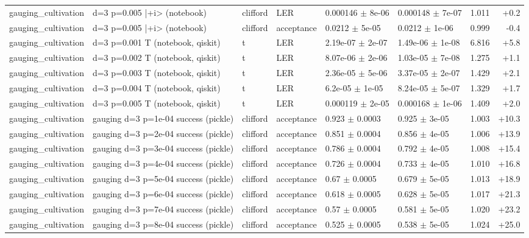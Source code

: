 \documentclass[10pt]{article}
\begin{document}
{\begin{longtable}{l l l l l l r r}
gauging\_cultivation & d=3 p=0.005 |+i> (notebook) & clifford & LER & 0.000146 $\pm$ 8e-06 & 0.000148 $\pm$ 7e-07 & 1.011 & +0.2 \\
gauging\_cultivation & d=3 p=0.005 |+i> (notebook) & clifford & acceptance & 0.0212 $\pm$ 5e-05 & 0.0212 $\pm$ 1e-06 & 0.999 & -0.4 \\
gauging\_cultivation & d=3 p=0.001 T (notebook, qiskit) & t & LER & 2.19e-07 $\pm$ 2e-07 & 1.49e-06 $\pm$ 1e-08 & 6.816 & +5.8 \\
gauging\_cultivation & d=3 p=0.002 T (notebook, qiskit) & t & LER & 8.07e-06 $\pm$ 2e-06 & 1.03e-05 $\pm$ 7e-08 & 1.275 & +1.1 \\
gauging\_cultivation & d=3 p=0.003 T (notebook, qiskit) & t & LER & 2.36e-05 $\pm$ 5e-06 & 3.37e-05 $\pm$ 2e-07 & 1.429 & +2.1 \\
gauging\_cultivation & d=3 p=0.004 T (notebook, qiskit) & t & LER & 6.2e-05 $\pm$ 1e-05 & 8.24e-05 $\pm$ 5e-07 & 1.329 & +1.7 \\
gauging\_cultivation & d=3 p=0.005 T (notebook, qiskit) & t & LER & 0.000119 $\pm$ 2e-05 & 0.000168 $\pm$ 1e-06 & 1.409 & +2.0 \\
gauging\_cultivation & gauging d=3 p=1e-04 success (pickle) & clifford & acceptance & 0.923 $\pm$ 0.0003 & 0.925 $\pm$ 3e-05 & 1.003 & +10.3 \\
gauging\_cultivation & gauging d=3 p=2e-04 success (pickle) & clifford & acceptance & 0.851 $\pm$ 0.0004 & 0.856 $\pm$ 4e-05 & 1.006 & +13.9 \\
gauging\_cultivation & gauging d=3 p=3e-04 success (pickle) & clifford & acceptance & 0.786 $\pm$ 0.0004 & 0.792 $\pm$ 4e-05 & 1.008 & +15.4 \\
gauging\_cultivation & gauging d=3 p=4e-04 success (pickle) & clifford & acceptance & 0.726 $\pm$ 0.0004 & 0.733 $\pm$ 4e-05 & 1.010 & +16.8 \\
gauging\_cultivation & gauging d=3 p=5e-04 success (pickle) & clifford & acceptance & 0.67 $\pm$ 0.0005 & 0.679 $\pm$ 5e-05 & 1.013 & +18.9 \\
gauging\_cultivation & gauging d=3 p=6e-04 success (pickle) & clifford & acceptance & 0.618 $\pm$ 0.0005 & 0.628 $\pm$ 5e-05 & 1.017 & +21.3 \\
gauging\_cultivation & gauging d=3 p=7e-04 success (pickle) & clifford & acceptance & 0.57 $\pm$ 0.0005 & 0.581 $\pm$ 5e-05 & 1.020 & +23.2 \\
gauging\_cultivation & gauging d=3 p=8e-04 success (pickle) & clifford & acceptance & 0.525 $\pm$ 0.0005 & 0.538 $\pm$ 5e-05 & 1.024 & +25.0 \\

\end{longtable}}
\end{document}
